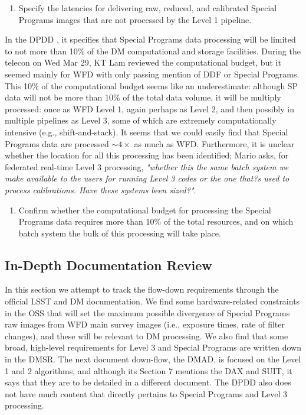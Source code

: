 \documentclass[DM,lsstdraft,toc]{lsstdoc}
\begin{document}
\begin{enumerate}[resume,topsep=-10pt,label= \textbf{Action \Roman*.}] \item Specify the latencies for delivering raw, reduced, and calibrated Special Programs images that are not processed by the Level 1 pipeline. \end{enumerate}

In the DPDD \citep{LSE-163}, it specifies that Special Programs data processing will be limited to not more than 10\% of the DM computational and storage facilities. During the telecon on Wed Mar 29, KT Lam reviewed the computational budget, but it seemed mainly for WFD with only passing mention of DDF or Special Programs. This 10\% of the computational budget seems like an underestimate: although SP data will not be more than 10\% of the total data volume, it will be multiply processed: once as WFD Level 1, again perhaps as Level 2, and then possibly in multiple pipelines as Level 3, some of which are extremely computationally intensive (e.g., shift-and-stack). It seems that we could easily find that Special Programs data are processed $\sim4\times$ as much as WFD. Furthermore, it is unclear whether the location for all this processing has been identified; Mario asks, for federated real-time Level 3 processing, {\it "whether this the same batch system we make available to the users for running Level 3 codes or the one that?s used to process calibrations. Have these systems been sized?"}.

\begin{enumerate}[resume,topsep=-10pt,label= \textbf{Action \Roman*.}] \item Confirm whether the computational budget for processing the Special Programs data requires more than 10\% of the total resources, and on which batch system the bulk of this processing will take place. \end{enumerate}



\subsection{In-Depth Documentation Review}\label{ssec:dmdocs_review}

In this section we attempt to track the flow-down requirements through the official LSST and DM documentation. We find some hardware-related constraints in the OSS that will set the maximum possible divergence of Special Programs raw images from WFD main survey images (i.e., exposure times, rate of filter changes), and these will be relevant to DM processing. We also find that some broad, high-level requirements for Level 3 and Special Programs are written down in the DMSR. The next document down-flow, the DMAD, is focused on the Level 1 and 2 algorithms, and although its Section 7 mentions the DAX and SUIT, it says that they are to be detailed in a different document. The DPDD also does not have much content that directly pertains to Special Programs and Level 3 processing.
\end{document}
